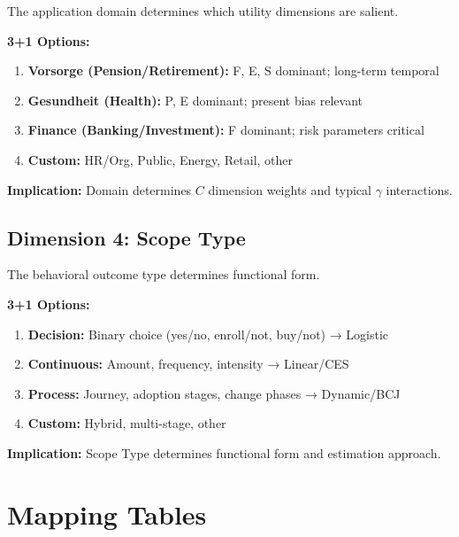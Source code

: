 The application domain determines which utility dimensions are salient.

\begin{tcolorbox}[colback=white, colframe=black,
    title=Dimension 3: Domain Selection]
\textbf{3+1 Options:}
\begin{enumerate}
\item[$\square$] \textbf{Vorsorge (Pension/Retirement):} F, E, S dominant; long-term temporal
\item[$\square$] \textbf{Gesundheit (Health):} P, E dominant; present bias relevant
\item[$\square$] \textbf{Finance (Banking/Investment):} F dominant; risk parameters critical
\item[$\square$] \textbf{Custom:} HR/Org, Public, Energy, Retail, other
\end{enumerate}

\textbf{Implication:} Domain determines $C$ dimension weights and typical $\gamma$ interactions.
\end{tcolorbox}

\subsection{Dimension 4: Scope Type}

The behavioral outcome type determines functional form.

\begin{tcolorbox}[colback=white, colframe=black,
    title=Dimension 4: Scope Type Selection]
\textbf{3+1 Options:}
\begin{enumerate}
\item[$\square$] \textbf{Decision:} Binary choice (yes/no, enroll/not, buy/not) → Logistic
\item[$\square$] \textbf{Continuous:} Amount, frequency, intensity → Linear/CES
\item[$\square$] \textbf{Process:} Journey, adoption stages, change phases → Dynamic/BCJ
\item[$\square$] \textbf{Custom:} Hybrid, multi-stage, other
\end{enumerate}

\textbf{Implication:} Scope Type determines functional form and estimation approach.
\end{tcolorbox}


\section{Mapping Tables}
\label{sec:ggg-mappings}

